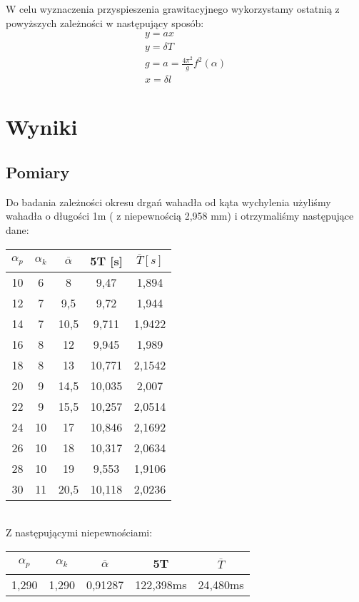 \documentclass{article}
\begin{document}
W celu wyznaczenia przyspieszenia grawitacyjnego wykorzystamy ostatnią z powyższych zależności w następujący sposób:
\begin{gather*}
    y = ax \\
    y = \delta T \\
    g = a = \frac{4\pi^2}{g}f^2(\alpha) \\
    x = \delta l 
\end{gather*}

\clearpage
\section{Wyniki}
\subsection{Pomiary}
Do badania zależności okresu drgań wahadła od kąta wychylenia użyliśmy wahadła o długości 1m ( z niepewnością 2,958 mm) i otrzymaliśmy następujące dane: 
\begin{table}[h!]
    \centering
    \begin{tabular}{|c|c|c|c|c|} \hline
    $\alpha_{p}$ & $\alpha_{k}$ & $\overline{\alpha}$ & 5T [s] & $\overline{T} [s]$ \\ \hline
    10	&	6	&	8	&	9,47	&	1,894	\\
    12	&	7	&	9,5	&	9,72	&	1,944	\\
    14	&	7	&	10,5	&	9,711	&	1,9422	\\
    16	&	8	&	12	&	9,945	&	1,989	\\
    18	&	8	&	13	&	10,771	&	2,1542	\\
    20	&	9	&	14,5	&	10,035	&	2,007	\\
    22	&	9	&	15,5	&	10,257	&	2,0514	\\
    24	&	10	&	17	&	10,846	&	2,1692	\\
    26	&	10	&	18	&	10,317	&	2,0634	\\
    28	&	10	&	19	&	9,553	&	1,9106	\\
    30	&	11	&	20,5	&	10,118	&	2,0236	\\ \hline
    \end{tabular}
\end{table}\\
Z następującymi niepewnościami:
\begin{table}[h!]
    \centering
    \begin{tabular}{|c|c|c|c|c|} \hline
    $\alpha_{p}$ & $\alpha_{k}$ & $\overline{\alpha}$ & 5T & $\overline{T}$ \\ \hline
    1,290	&	1,290	&	0,91287	&	122,398ms	&	24,480ms	\\ \hline
    \end{tabular}
\end{table}
\end{document}
